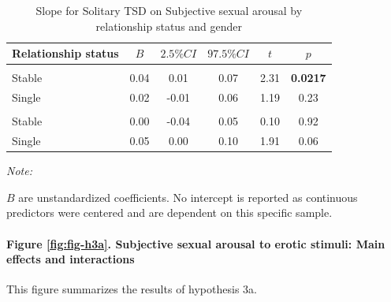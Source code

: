 \documentclass[
  bookmarksnumbered]{article}
\begin{document}
\begin{table}[H]
\centering
\caption{\label{tab:unnamed-chunk-28}Slope for Solitary TSD on
        Subjective sexual arousal by relationship status and gender}
\centering
\begin{threeparttable}
\begin{tabular}[t]{lccccc}
\toprule
Relationship status & $B$ & $2.5\% CI$ & $97.5\% CI$ & $t$ & $p$\\
\midrule
\addlinespace[0.3em]
\multicolumn{6}{l}{\cellcolor{lightgray}{Gender: Women}}\\
\hspace{1em}Stable & 0.04 & 0.01 & 0.07 & 2.31 & \textbf{0.0217}\\
\hspace{1em}Single & 0.02 & -0.01 & 0.06 & 1.19 & 0.23\\
\addlinespace[0.3em]
\multicolumn{6}{l}{\cellcolor{lightgray}{Gender: Men}}\\
\hspace{1em}Stable & 0.00 & -0.04 & 0.05 & 0.10 & 0.92\\
\hspace{1em}Single & 0.05 & 0.00 & 0.10 & 1.91 & 0.06\\
\bottomrule
\end{tabular}
\begin{tablenotes}[para]
\item \textit{Note: } 
\item $B$ are unstandardized coefficients.
           No intercept is reported as continuous predictors were centered
           and are dependent on this specific sample.
\end{tablenotes}
\end{threeparttable}
\end{table}

\paragraph{Figure \ref{fig:fig-h3a}. Subjective sexual arousal to erotic stimuli: Main effects and interactions}\label{figure-reffigfig-h3a.-subjective-sexual-arousal-to-erotic-stimuli-main-effects-and-interactions}

This figure summarizes the results of hypothesis 3a.
\end{document}
